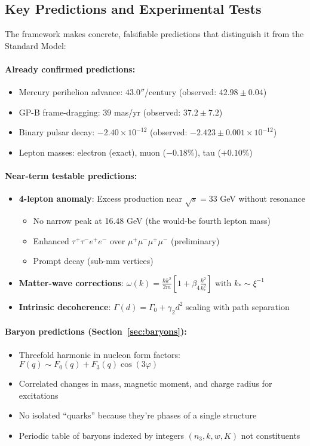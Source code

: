 \subsection{Key Predictions and Experimental Tests}

The framework makes concrete, falsifiable predictions that distinguish it from the Standard Model:

\paragraph{Already confirmed predictions:}
\begin{itemize}
\item Mercury perihelion advance: $43.0''$/century (observed: $42.98 \pm 0.04$)
\item GP-B frame-dragging: 39 mas/yr (observed: $37.2 \pm 7.2$)
\item Binary pulsar decay: $-2.40\times10^{-12}$ (observed: $-2.423 \pm 0.001\times10^{-12}$)
\item Lepton masses: electron (exact), muon ($-0.18\%$), tau ($+0.10\%$)
\end{itemize}

\paragraph{Near-term testable predictions:}
\begin{itemize}
\item \textbf{4-lepton anomaly}: Excess production near $\sqrt{s} = 33$ GeV without resonance
  \begin{itemize}
  \item No narrow peak at 16.48 GeV (the would-be fourth lepton mass)
  \item Enhanced $\tau^+\tau^-e^+e^-$ over $\mu^+\mu^-\mu^+\mu^-$ (preliminary)
  \item Prompt decay (sub-mm vertices)
  \end{itemize}
\item \textbf{Matter-wave corrections}: $\omega(k) = \frac{\hbar k^2}{2m}\left[1 + \beta_4\frac{k^2}{k_*^2}\right]$ with $k_* \sim \xi^{-1}$
\item \textbf{Intrinsic decoherence}: $\Gamma(d) = \Gamma_0 + \gamma_2 d^2$ scaling with path separation
\end{itemize}

\paragraph{Baryon predictions (Section~\ref{sec:baryons}):}
\begin{itemize}
\item Threefold harmonic in nucleon form factors: $F(q) \sim F_0(q) + F_3(q)\cos(3\varphi)$
\item Correlated changes in mass, magnetic moment, and charge radius for excitations
\item No isolated ``quarks'' because they're phases of a single structure
\item Periodic table of baryons indexed by integers $(n_3, k, w, K)$ not constituents
\end{itemize}

